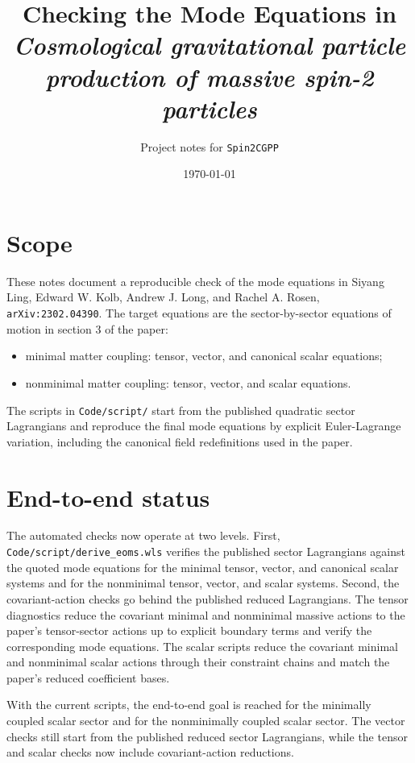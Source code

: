 \documentclass[11pt]{article}
\title{Checking the Mode Equations in\\ \textit{Cosmological gravitational particle production of massive spin-2 particles}}
\author{Project notes for \texttt{Spin2CGPP}}
\date{\today}
\begin{document}
\maketitle

\section{Scope}
These notes document a reproducible check of the mode equations in Siyang Ling, Edward W. Kolb, Andrew J. Long, and Rachel A. Rosen, \texttt{arXiv:2302.04390}. The target equations are the sector-by-sector equations of motion in section 3 of the paper:
\begin{itemize}[leftmargin=1.5em]
\item minimal matter coupling: tensor, vector, and canonical scalar equations;
\item nonminimal matter coupling: tensor, vector, and scalar equations.
\end{itemize}

The scripts in \texttt{Code/script/} start from the published quadratic sector Lagrangians and reproduce the final mode equations by explicit Euler-Lagrange variation, including the canonical field redefinitions used in the paper.

\section{End-to-end status}
The automated checks now operate at two levels. First, \texttt{Code/script/derive\_eoms.wls} verifies the published sector Lagrangians against the quoted mode equations for the minimal tensor, vector, and canonical scalar systems and for the nonminimal tensor, vector, and scalar systems. Second, the covariant-action checks go behind the published reduced Lagrangians. The tensor diagnostics reduce the covariant minimal and nonminimal massive actions to the paper's tensor-sector actions up to explicit boundary terms and verify the corresponding mode equations. The scalar scripts reduce the covariant minimal and nonminimal scalar actions through their constraint chains and match the paper's reduced coefficient bases.

With the current scripts, the end-to-end goal is reached for the minimally coupled scalar sector and for the nonminimally coupled scalar sector. The vector checks still start from the published reduced sector Lagrangians, while the tensor and scalar checks now include covariant-action reductions.
\end{document}
